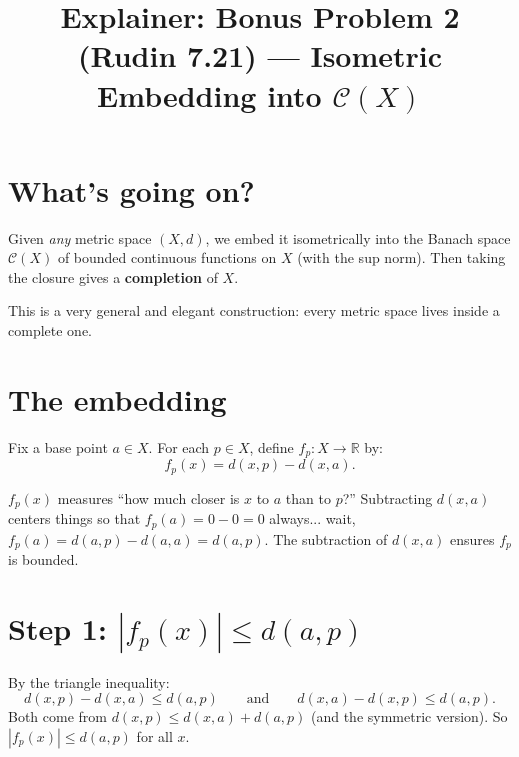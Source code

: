 \documentclass[12pt]{article}
\title{Explainer: Bonus Problem 2 (Rudin 7.21) --- Isometric Embedding into $\mathscr{C}(X)$}
\author{}
\date{}
\begin{document}
\maketitle

\section*{What's going on?}
Given \emph{any} metric space $(X, d)$, we embed it isometrically into the Banach space $\mathscr{C}(X)$ of bounded continuous functions on $X$ (with the sup norm). Then taking the closure gives a \textbf{completion} of $X$.

This is a very general and elegant construction: every metric space lives inside a complete one.

\section*{The embedding}

Fix a base point $a \in X$. For each $p \in X$, define $f_p : X \to \mathbb{R}$ by:
$$
f_p(x) = d(x,p) - d(x,a).
$$

\begin{center}
\end{center}

$f_p(x)$ measures ``how much closer is $x$ to $a$ than to $p$?'' Subtracting $d(x,a)$ centers things so that $f_p(a) = 0 - 0 = 0$ always... wait, $f_p(a) = d(a,p) - d(a,a) = d(a,p)$. The subtraction of $d(x,a)$ ensures $f_p$ is bounded.

\section*{Step 1: $|f_p(x)| \leq d(a,p)$}

By the triangle inequality:
$$
d(x,p) - d(x,a) \leq d(a,p) \qquad \text{and} \qquad d(x,a) - d(x,p) \leq d(a,p).
$$
Both come from $d(x,p) \leq d(x,a) + d(a,p)$ (and the symmetric version). So $|f_p(x)| \leq d(a,p)$ for all $x$.
\end{document}
